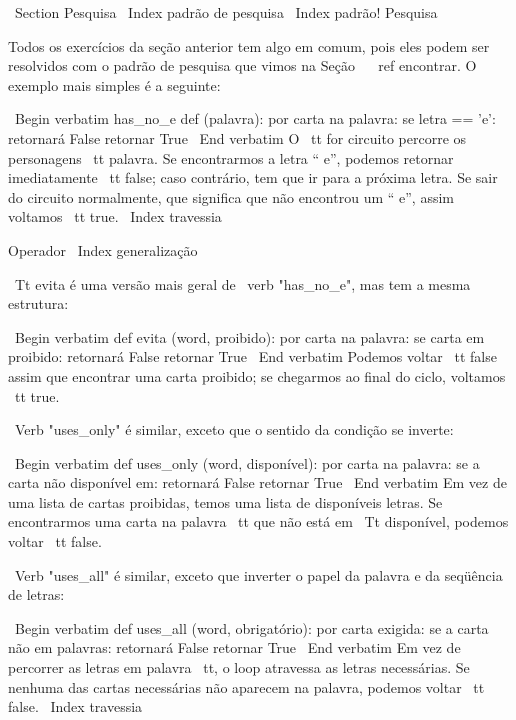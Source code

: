 \documentclass[10pt]{book}
\begin{document}
{{{{{{\ Section {} Pesquisa
\ Index {padrão de pesquisa}
\ Index {padrão! Pesquisa}

Todos os exercícios da seção anterior tem algo
em comum, pois eles podem ser resolvidos com o padrão de pesquisa que vimos
na Seção ~ \ ref {} encontrar. O exemplo mais simples é a seguinte:

\ Begin {verbatim}
has_no_e def (palavra):
    por carta na palavra:
        se letra == 'e':
            retornará False
    retornar True
\ End {verbatim}
%
O {\ tt for} circuito percorre os personagens {\ tt palavra}. Se encontrarmos
a letra `` e'', podemos retornar imediatamente {\ tt false}; caso contrário,
tem que ir para a próxima letra. Se sair do circuito normalmente, que
significa que não encontrou um `` e'', assim voltamos {\ tt true}.
\ Index {travessia}


Operador%
\ Index {generalização}

{\ Tt evita} é uma versão mais geral de \ verb "has_no_e", mas
tem a mesma estrutura:

\ Begin {verbatim}
def evita (word, proibido):
    por carta na palavra:
        se carta em proibido:
            retornará False
    retornar True
\ End {verbatim}
%
Podemos voltar {\ tt false} assim que encontrar uma carta proibido;
se chegarmos ao final do ciclo, voltamos {\ tt true}.

\ Verb "uses_only" é similar, exceto que o sentido da condição
se inverte:

\ Begin {verbatim}
def uses_only (word, disponível):
    por carta na palavra: 
        se a carta não disponível em:
            retornará False
    retornar True
\ End {verbatim}
%
Em vez de uma lista de cartas proibidas, temos uma lista de disponíveis
letras. Se encontrarmos uma carta na palavra {\ tt} que não está em
{\ Tt disponível}, podemos voltar {\ tt false}.

\ Verb "uses_all" é similar, exceto que inverter o papel
da palavra e da seqüência de letras:

\ Begin {verbatim}
def uses_all (word, obrigatório):
    por carta exigida: 
        se a carta não em palavras:
            retornará False
    retornar True
\ End {verbatim}
%
Em vez de percorrer as letras em {palavra \ tt}, o loop
atravessa as letras necessárias. Se nenhuma das cartas necessárias
não aparecem na palavra, podemos voltar {\ tt false}.
\ Index {travessia}

}}}}}}
\end{document}
